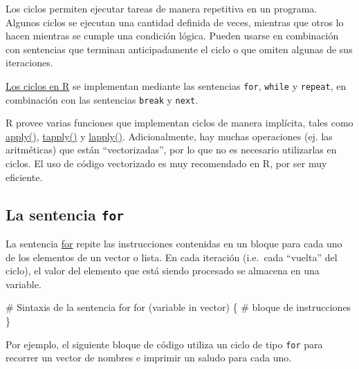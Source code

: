 \documentclass[
  letterpaper,
  DIV=11,
  numbers=noendperiod]{scrreprt}
\newenvironment{Shaded}{\begin{snugshade}}{\end{snugshade}}
\newcommand{\CommentTok}[1]{\textcolor[rgb]{0.37,0.37,0.37}{#1}}
\newcommand{\ControlFlowTok}[1]{\textcolor[rgb]{0.00,0.23,0.31}{#1}}
\newcommand{\NormalTok}[1]{\textcolor[rgb]{0.00,0.23,0.31}{#1}}
\begin{document}
Los ciclos permiten ejecutar tareas de manera repetitiva en un programa.
Algunos ciclos se ejecutan una cantidad definida de veces, mientras que
otros lo hacen mientras se cumple una condición lógica. Pueden usarse en
combinación con sentencias que terminan anticipadamente el ciclo o que
omiten algunas de sus iteraciones.

\href{https://cran.r-project.org/doc/manuals/r-devel/R-lang.html\#Looping}{Los
ciclos en R} se implementan mediante las sentencias \texttt{for},
\texttt{while} y \texttt{repeat}, en combinación con las sentencias
\texttt{break} y \texttt{next}.

R provee varias funciones que implementan ciclos de manera implícita,
tales como \href{https://rdrr.io/r/base/apply.html}{apply()},
\href{https://rdrr.io/r/base/tapply.html}{tapply()} y
\href{https://rdrr.io/r/base/lapply.html}{lapply()}. Adicionalmente, hay
muchas operaciones (ej. las aritméticas) que están ``vectorizadas'', por
lo que no es necesario utilizarlas en ciclos. El uso de código
vectorizado es muy recomendado en R, por ser muy eficiente.

\hypertarget{la-sentencia-for}{%
\subsection{\texorpdfstring{La sentencia
\texttt{for}}{La sentencia for}}\label{la-sentencia-for}}

La sentencia
\href{https://cran.r-project.org/doc/manuals/r-devel/R-lang.html\#for}{for}
repite las instrucciones contenidas en un bloque para cada uno de los
elementos de un vector o lista. En cada iteración (i.e.~cada ``vuelta''
del ciclo), el valor del elemento que está siendo procesado se almacena
en una variable.

\begin{Shaded}
\begin{Highlighting}[]
\CommentTok{\# Sintaxis de la sentencia for}
\ControlFlowTok{for}\NormalTok{ (variable }\ControlFlowTok{in}\NormalTok{ vector) \{}
  \CommentTok{\# bloque de instrucciones}
\NormalTok{\}}
\end{Highlighting}
\end{Shaded}

Por ejemplo, el siguiente bloque de código utiliza un ciclo de tipo
\texttt{for} para recorrer un vector de nombres e imprimir un saludo
para cada uno.
\end{document}
